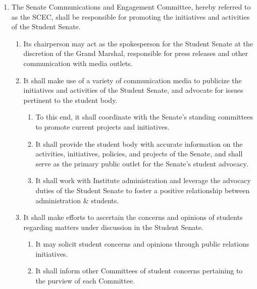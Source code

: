 \documentclass{uniondoc}
\begin{document}
\begin{enumerate}
\begin{enumerate}
		            At such a meeting, quorum shall be 2/3 the voting membership, less the Vice Commissioner.
		            The Vice Commissioner shall not have a vote at any meeting that they chair.
		            In the event of the resignation, removal, or extended absence of the Commissioner, the Vice Commissioner shall assume the duties of the Commissioner, until the Commissioner is able to resume their duties, or until a new Commissioner has been appointed.
	      \end{enumerate}
	\item The Senate Communications and Engagement Committee, hereby referred to as the SCEC, shall be responsible for promoting the initiatives and activities of the Student Senate.
	      \begin{enumerate}
		      \item Its chairperson may act as the spokesperson for the Student Senate at the discretion of the Grand Marshal, responsible for press releases and other communication with media outlets.
		      \item It shall make use of a variety of communication media to publicize the initiatives and activities of the Student Senate,
		            and advocate for issues pertinent to the student body.
		            \begin{enumerate}
			            \item To this end, it shall coordinate with the Senate’s standing committees to promote current projects and initiatives.
			            \item It shall provide the student body with accurate information on the activities, initiatives, policies, and projects of the Senate,
			                  and shall serve as the primary public outlet for the Senate’s student advocacy.
			            \item It shall work with Institute administration and leverage the advocacy duties of the Student Senate to foster a positive relationship between administration \& students.
		            \end{enumerate}
		      \item It shall make efforts to ascertain the concerns and opinions of students regarding matters under discussion in the Student Senate.
		            \begin{enumerate}
			            \item It may solicit student concerns and opinions through public relations initiatives.
			            \item It shall inform other Committees of student concerns pertaining to the purview of each Committee.

\end{enumerate}
\end{enumerate}
\end{enumerate}
\end{document}
